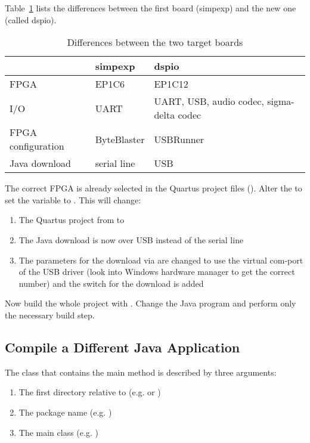 Table~\ref{tab:boards} lists the  differences between the first
board (simpexp) and the new one (called dspio).
%
\begin{table}
    \centering

\begin{tabular}{lll}
    \toprule
       & simpexp & dspio \\
    \midrule
    FPGA & EP1C6 & EP1C12 \\
    I/O & UART & UART, USB, audio codec, sigma-delta codec \\
    FPGA configuration & ByteBlaster & USBRunner \\
    Java download & serial line & USB \\

    \bottomrule

\end{tabular}
    \caption{Differences between the two target boards}
    \label{tab:boards}

\end{table}
%
The correct FPGA is already selected in the Quartus project files
(). Alter the  to set the variable
 to . This will change:

\begin{enumerate}
    \item The Quartus project from  to 
    \item The Java download is now over USB instead of the serial
        line
    \item The parameters for the download via  are
        changed to use the virtual com-port of the USB driver
        (look into Windows hardware manager to get the correct
        number) and the switch  for the download is
        added
\end{enumerate}

Now build the whole project with . Change the Java
program and perform only the necessary build step.

\subsection{Compile a Different Java Application}

The class that contains the main method is described by three
arguments:
\begin{enumerate}
    \item The first directory relative to 
    (e.g.  or )
    \item The package name (e.g. )
    \item The main class (e.g. )
\end{enumerate}


